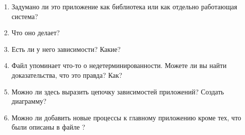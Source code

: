 \begin{enumerate}
	\item Задумано ли это приложение как библиотека или как отдельно работающая система?
	\item Что оно делает?
	\item Есть ли у него зависимости? Какие?
	\item Файл  упоминает что-то о недетерминированности. Можете ли вы найти доказательства, что это правда? Как?
	\item Можно ли здесь выразить цепочку зависимостей приложений? Создать диаграмму?
	\item Можно ли добавить новые процессы к главному приложению кроме тех, что были описаны в файле ?
\end{enumerate}


